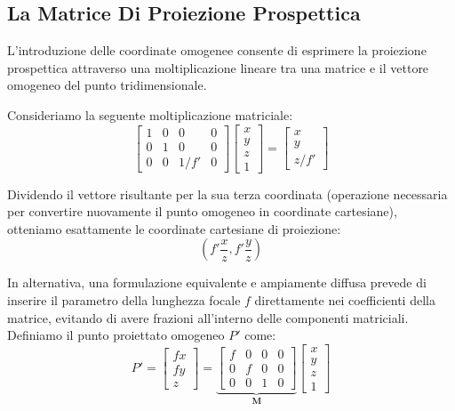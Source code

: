 ﻿\documentclass[11pt, a4paper]{article}
\begin{document}
\subsection{La Matrice Di Proiezione Prospettica}

L'introduzione delle coordinate omogenee consente di esprimere la proiezione prospettica attraverso una moltiplicazione lineare tra una matrice e il vettore omogeneo del punto tridimensionale.

Consideriamo la seguente moltiplicazione matriciale:
\begin{equation}
    \begin{bmatrix} 1 & 0 & 0 & 0 \\ 0 & 1 & 0 & 0 \\ 0 & 0 & 1/f' & 0 \end{bmatrix} \begin{bmatrix} x \\ y \\ z \\ 1 \end{bmatrix} = \begin{bmatrix} x \\ y \\ z/f' \end{bmatrix}
\end{equation}

Dividendo il vettore risultante per la sua terza coordinata (operazione necessaria per convertire nuovamente il punto omogeneo in coordinate cartesiane), otteniamo esattamente le coordinate cartesiane di proiezione:
\[
\left(f'\frac{x}{z}, f'\frac{y}{z}\right)
\]

In alternativa, una formulazione equivalente e ampiamente diffusa prevede di inserire il parametro della lunghezza focale $f$ direttamente nei coefficienti della matrice, evitando di avere frazioni all'interno delle componenti matriciali. Definiamo il punto proiettato omogeneo $P'$ come:
\begin{equation}
    P' = \begin{bmatrix} f x \\ f y \\ z \end{bmatrix} = \underbrace{\begin{bmatrix} f & 0 & 0 & 0 \\ 0 & f & 0 & 0 \\ 0 & 0 & 1 & 0 \end{bmatrix}}_{\bm{M}} \begin{bmatrix} x \\ y \\ z \\ 1 \end{bmatrix}
\end{equation}
\end{document}

